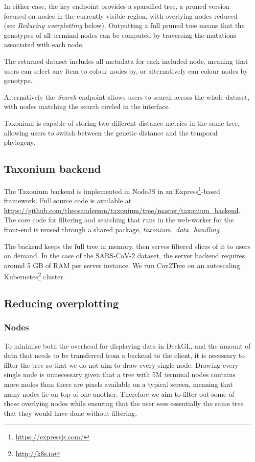 In either case, the key endpoint provides a sparsified tree, a pruned version focused on nodes in the currently visible region, with overlying nodes reduced (see \textit{Reducing overplotting} below). Outputting a full pruned tree means that the genotypes of all terminal nodes can be computed by traversing the mutations associated with each node.

The returned dataset includes all metadata for each included node, meaning that users can select any item to colour nodes by, or alternatively can colour nodes by genotype.

Alternatively the \emph{Search} endpoint allows users to search across the whole dataset, with nodes matching the search circled in the interface.

Taxonium is capable of storing two different distance metrics in the same tree, allowing users to switch between the genetic distance and the temporal phylogeny. 




\subsection*{Taxonium backend}
The Taxonium backend is implemented in NodeJS in an Express\footnote{\url{https://expressjs.com/}}-based framework. Full source code is available at \url{https://github.com/theosanderson/taxonium/tree/master/taxonium_backend}. The core code for filtering and searching that runs in the web-worker for the front-end is reused through a shared package, \emph{taxonium\_data\_handling}.

The backend keeps the full tree in memory, then serves filtered slices of it to users on demand. In the case of the SARS-CoV-2 dataset, the server backend requires around 5 GB of RAM per server instance. We run Cov2Tree on an autoscaling Kubernetes\footnote{\url{http://k8s.io}} cluster.


\subsection*{Reducing overplotting}
\subsubsection*{Nodes}

To minimise both the overhead for displaying data in DeckGL, and the amount of data that needs to be transferred from a backend to the client, it is necessary to filter the tree so that we do not aim to draw every single node. Drawing every single node is unnecessary given that a tree with 5M terminal nodes contains more nodes than there are pixels available on a typical screen, meaning that many nodes lie on top of one another. Therefore we aim to filter out some of these overlying nodes while ensuring that the user sees essentially the same tree that they would have done without filtering.

